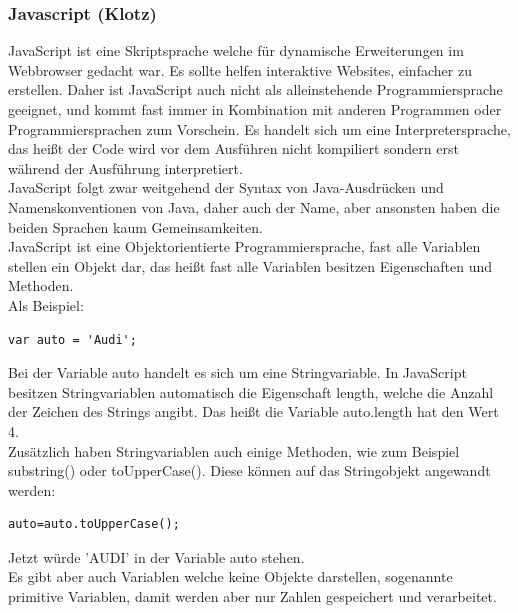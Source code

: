 \subsubsection{Javascript (Klotz)}
\label{sec:content_js_Javascript}
JavaScript ist eine Skriptsprache welche für dynamische Erweiterungen im Webbrowser gedacht war. Es sollte helfen interaktive Websites, einfacher zu erstellen. Daher ist JavaScript auch nicht als alleinstehende Programmiersprache geeignet, und kommt fast immer in Kombination mit anderen Programmen oder Programmiersprachen zum Vorschein. Es handelt sich um eine Interpretersprache, das heißt der Code wird vor dem Ausführen nicht kompiliert sondern erst während der Ausführung interpretiert.\\
JavaScript folgt zwar weitgehend der Syntax von Java-Ausdrücken und Namenskonventionen von Java, daher auch der Name, aber ansonsten haben die beiden Sprachen kaum Gemeinsamkeiten.\\
JavaScript ist eine Objektorientierte Programmiersprache, fast alle Variablen stellen ein Objekt dar, das heißt fast alle Variablen besitzen Eigenschaften und Methoden.\\
Als Beispiel:\\
\begin{lstlisting}[language=html]
	var auto = 'Audi';
\end{lstlisting}
Bei der Variable auto handelt es sich um eine Stringvariable. In JavaScript besitzen Stringvariablen automatisch die Eigenschaft length, welche die Anzahl der Zeichen des Strings angibt. Das heißt die Variable auto.length hat den Wert 4.\\
Zusätzlich haben Stringvariablen auch einige Methoden, wie zum Beispiel substring() oder toUpperCase(). Diese können auf das Stringobjekt angewandt werden:\\
\begin{lstlisting}[language=html]
	auto=auto.toUpperCase();
\end{lstlisting}
Jetzt würde 'AUDI' in der Variable auto stehen.\\

Es gibt aber auch Variablen welche keine Objekte darstellen, sogenannte primitive Variablen, damit werden aber nur Zahlen gespeichert und verarbeitet.\\

